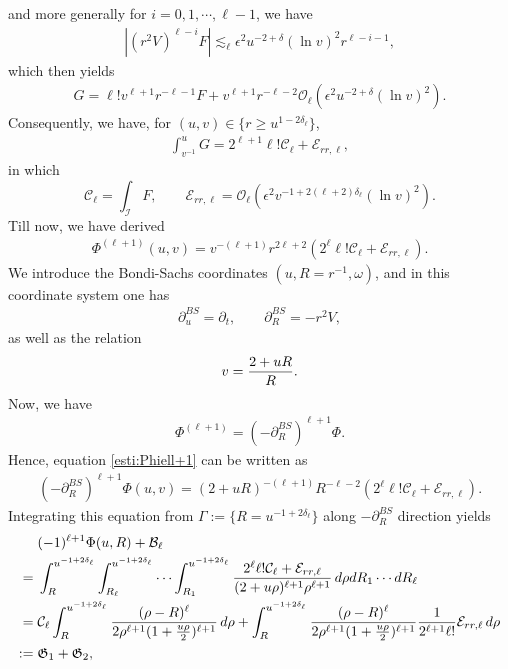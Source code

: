 \documentclass[a4paper,reqno]{amsart}
\theoremstyle{definition}
\numberwithin{equation}{section}
\def\ep{\epsilon}
\def\lab{\label}
\begin{document}
and more generally for $i= 0, 1, \cdots, \ell-1$, we have
\begin{align*}
    |(r^2 V)^{\ell-i} F|
    \lesssim_\ell \ep^2
    u^{-2+\delta} (\ln{v})^2 r^{\ell-i-1},
\end{align*}
which then yields
\begin{align*}
    G = \ell! v^{\ell+1} r^{-\ell-1} F
    + v^{\ell+1} r^{-\ell-2} \mathcal{O}_\ell (\ep^2 u^{-2+\delta} (\ln{v})^2).
\end{align*}
Consequently, we have, for $(u,v)\in\{ r\geq u^{1-2\delta_\ell} \}$,
\begin{align*}
    \int_{v^{-1}}^u G
    =2^{\ell+1} \ell! \mathcal{C}_\ell + \mathcal{E}_{rr, \ell},
\end{align*}
in which 
\begin{equation}
\lab{esti:CellandErrell}
\mathcal{C}_\ell = \int_{\mathcal{I}} F,
\qquad
\mathcal{E}_{rr, \ell}
= \mathcal{O}_\ell (\ep^2  v^{-1+ 2(\ell+2)\delta_\ell} (\ln{v})^2).
\end{equation}
Till now, we have derived
\begin{align}
\lab{esti:Phiell+1}
    \Phi^{(\ell+1)}(u, v)
    =
    v^{-(\ell+1)} r^{2\ell+2} (2^{\ell} \ell! \mathcal{C}_\ell + \mathcal{E}_{rr, \ell}).
\end{align}
We introduce the Bondi-Sachs coordinates $(u, R=r^{-1}, \omega)$, and in this coordinate system one has
\begin{align*}
    {\partial}^{BS}_u = \partial_t,
    \qquad
    \partial^{BS}_R = -r^2 V,
\end{align*}
as well as the relation
$$
v= {2+uR \over R}.
$$
Now, we have
\begin{align*}
    \Phi^{(\ell+1)} = (-\partial_R^{BS})^{\ell+1} \Phi.
\end{align*}
Hence, equation \eqref{esti:Phiell+1} can be written as
\begin{align}
\lab{esti:PhipartialRell+1derivatives}
   (-\partial_R^{BS})^{\ell+1} \Phi(u, v)
    =
    (2+uR)^{-(\ell+1)} R^{-\ell-2} (2^{\ell} \ell! \mathcal{C}_\ell + \mathcal{E}_{rr, \ell}).
\end{align}
Integrating this equation from $\Gamma := \{R = u^{-1+2\delta_{\ell}} \}$  along $-\partial_R^{BS}$ direction yields
\begin{align*}
    &(-1)^{\ell+1}\Phi(u, R) + \mathcal{B}_\ell
    \\
    ={}
    &\int_{R}^{u^{-1+2\delta_{\ell}}} \int_{R_\ell}^{u^{-1+2\delta_{\ell}}} \cdots \int_{R_1}^{u^{-1+2\delta_{\ell}}} {2^{\ell} \ell! \mathcal{C}_\ell + \mathcal{E}_{rr, \ell} \over (2+u\rho)^{\ell+1} \rho^{\ell+1}} \, d\rho dR_1 \cdots dR_{\ell}
    \\
    ={}
    &\mathcal{C}_\ell \int_{R}^{u^{-1+2\delta_{\ell}}} {(\rho-R)^\ell \over 2\rho^{\ell+1} (1+{u\rho\over 2})^{\ell+1}}   \, d\rho
    +\int_{R}^{u^{-1+2\delta_{\ell}}} {(\rho-R)^\ell \over 2\rho^{\ell+1} (1+{u\rho\over 2})^{\ell+1}}  {1\over 2^{\ell+1} \ell!}\mathcal{E}_{rr, \ell}  \, d\rho
    \\
    :={}
    &\mathfrak{G}_1 + \mathfrak{G}_2,
\end{align*}
\end{document}
